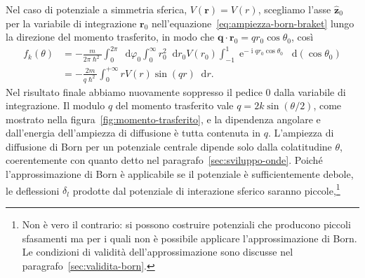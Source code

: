 \documentclass[a4paper,fleqn,twoside,12pt]{article}
\renewcommand{\phi}{\varphi}
\newcommand*{\dd}{\mathop{}\!\mathrm{d}} %
\DeclareMathOperator{\e}{\mathrm{e}} %
\DeclareMathOperator{\uimm}{\mathrm{i}} %
\DeclarePairedDelimiter{\abs}{\lvert}{\rvert}
\newcommand*{\versor}[1]{\hat{\bm{#1}}}
\begin{document}
\begin{SCfigure}[2]
  \centering
  \caption{Il momento trasferito $\bm{q} = \bm{k}' - \bm{k}$ è la base del
    triangolo isoscele di lati lunghi $k$ e con angolo al vertice $\theta$,
    quindi $q = \abs{\bm{q}} = 2k\sin(\theta/2)$.}
\label{fig:momento-trasferito}
\end{SCfigure}
Nel caso di potenziale a simmetria sferica, $V(\bm{r}) = V(r)$, scegliamo l'asse
$\versor{z}_{0}$ per la variabile di integrazione $\bm{r}_{0}$
nell'equazione~\eqref{eq:ampiezza-born-braket} lungo la direzione del momento
trasferito, in modo che $\bm{q}\cdot\bm{r}_{0} = qr_{0}\cos\theta_{0}$, così
\begin{equation}
  \label{eq:ampiezza-born-centrale}
  \begin{split}
    f_{k}(\theta) &= -\frac{m}{2\pi\hslash^{2}} \int_{0}^{2\pi}\dd\phi_{0}
    \int_{0}^{\infty}r_{0}^{2}\dd r_{0} V(r_{0}) \int_{-1}^{1}\e^{-\uimm q
      r_{0}\cos\theta_{0}} \dd(\cos\theta_{0}) \\
    &= -\frac{2m}{q\hslash^{2}}\int_{0}^{+\infty} rV(r)\sin(qr)\dd r.
  \end{split}
\end{equation}
Nel risultato finale abbiamo nuovamente soppresso il pedice $0$ dalla variabile
di integrazione.  Il modulo $q$ del momento trasferito vale
$q = 2k\sin(\theta/2)$, come mostrato nella figura~\ref{fig:momento-trasferito},
e la dipendenza angolare e dall'energia dell'ampiezza di diffusione è tutta
contenuta in $q$.  L'ampiezza di diffusione di Born per un potenziale centrale
dipende solo dalla colatitudine $\theta$, coerentemente con quanto detto nel
paragrafo~\ref{sec:sviluppo-onde}.  Poiché l'approssimazione di Born è
applicabile se il potenziale è sufficientemente debole, le deflessioni
$\delta_{l}$ prodotte dal potenziale di interazione sferico saranno
piccole,\footnote{Non è vero il contrario: si possono costruire potenziali che
  producono piccoli sfasamenti ma per i quali non è possibile applicare
  l'approssimazione di Born.  Le condizioni di validità dell'approssimazione
  sono discusse nel paragrafo~\ref{sec:validita-born}.}
\end{document}
